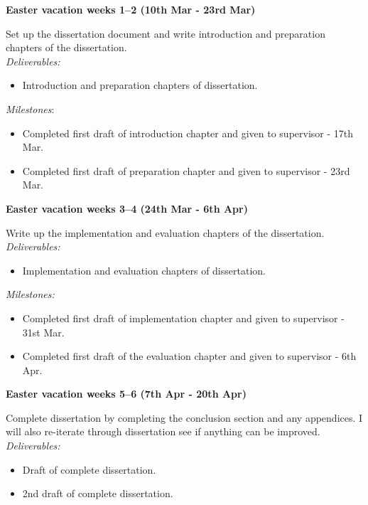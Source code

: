 \documentclass[12pt,a4paper,twoside]{article}
\begin{document}
{\bf Easter vacation weeks 1--2 (10th Mar - 23rd Mar)} 

Set up the dissertation document and write introduction and preparation 
chapters of the dissertation. \\

{\em Deliverables:} 
\begin{itemize} 
    \item 
    Introduction and preparation chapters of dissertation.
\end{itemize}

{\em Milestones}: 
\begin{itemize}
    \item 
    Completed first draft of introduction chapter and given to supervisor 
    - 17th Mar.
    \item 
    Completed first draft of preparation chapter and given to supervisor 
    - 23rd Mar.
\end{itemize}




{\bf Easter vacation weeks 3--4 (24th Mar - 6th Apr)} 

Write up the implementation and evaluation chapters of the dissertation. \\

{\em Deliverables:} 
\begin{itemize} 
    \item 
    Implementation and evaluation chapters of dissertation.
\end{itemize}

{\em Milestones:}
\begin{itemize}
    \item 
    Completed first draft of implementation chapter and given to supervisor 
    - 31st Mar.
    \item 
    Completed first draft of the evaluation chapter and given to supervisor 
    - 6th Apr.
\end{itemize}




{\bf Easter vacation weeks 5--6 (7th Apr - 20th Apr)} 

Complete dissertation by completing the conclusion section and any appendices. 
I will also re-iterate through dissertation see if anything can be improved. \\

{\em Deliverables:} 
\begin{itemize} 
    \item 
    Draft of complete dissertation.
    \item 
    2nd draft of complete dissertation.
\end{itemize}
\end{document}
